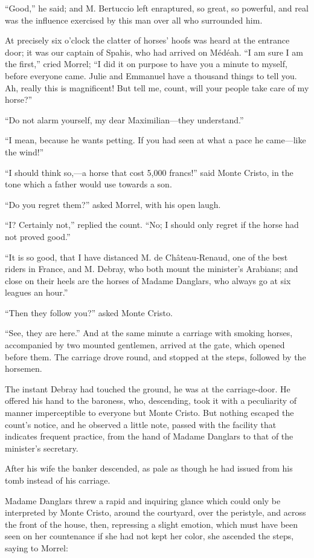 “Good,” he said; and M. Bertuccio left enraptured, so great, so
powerful, and real was the influence exercised by this man over all who
surrounded him.

At precisely six o’clock the clatter of horses’ hoofs was heard at the
entrance door; it was our captain of Spahis, who had arrived on Médéah.
“I am sure I am the first,” cried Morrel; “I did it on purpose to have
you a minute to myself, before everyone came. Julie and Emmanuel have a
thousand things to tell you. Ah, really this is magnificent! But tell
me, count, will your people take care of my horse?”

“Do not alarm yourself, my dear Maximilian—they understand.”

“I mean, because he wants petting. If you had seen at what a pace he
came—like the wind!”

“I should think so,—a horse that cost 5,000 francs!” said Monte Cristo,
in the tone which a father would use towards a son.

“Do you regret them?” asked Morrel, with his open laugh.

“I? Certainly not,” replied the count. “No; I should only regret if the
horse had not proved good.”

“It is so good, that I have distanced M. de Château-Renaud, one of the
best riders in France, and M. Debray, who both mount the minister’s
Arabians; and close on their heels are the horses of Madame Danglars,
who always go at six leagues an hour.”

“Then they follow you?” asked Monte Cristo.

“See, they are here.” And at the same minute a carriage with smoking
horses, accompanied by two mounted gentlemen, arrived at the gate,
which opened before them. The carriage drove round, and stopped at the
steps, followed by the horsemen.

The instant Debray had touched the ground, he was at the carriage-door.
He offered his hand to the baroness, who, descending, took it with a
peculiarity of manner imperceptible to everyone but Monte Cristo. But
nothing escaped the count’s notice, and he observed a little note,
passed with the facility that indicates frequent practice, from the
hand of Madame Danglars to that of the minister’s secretary.

After his wife the banker descended, as pale as though he had issued
from his tomb instead of his carriage.

Madame Danglars threw a rapid and inquiring glance which could only be
interpreted by Monte Cristo, around the courtyard, over the peristyle,
and across the front of the house, then, repressing a slight emotion,
which must have been seen on her countenance if she had not kept her
color, she ascended the steps, saying to Morrel:

